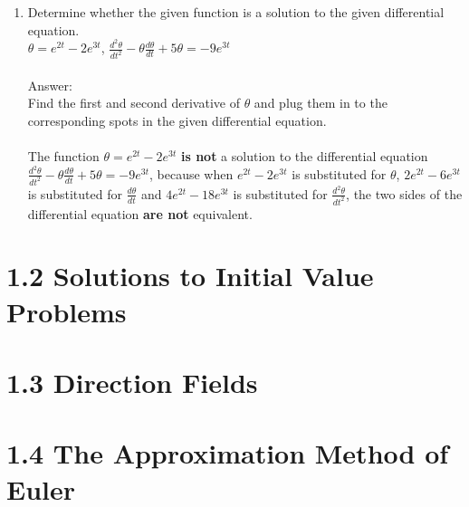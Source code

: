 \documentclass[12pt]{report}
\begin{document}
\begin{enumerate}
				\item Determine whether the given function is a solution to the given differential equation.\\
				$\theta =e^{2t}-2e^{3t}$, $\frac{d^2\theta}{dt^2}-\theta \frac{d\theta}{dt}+5\theta =-9e^{3t}$\\\\
				Answer:\\
				Find the first and second derivative of $\theta$ and plug them in to the corresponding spots in the given differential equation.\\\\
				The function $\theta =e^{2t}-2e^{3t}$ \textbf{is not} a solution to the differential equation $\frac{d^2\theta}{dt^2}-\theta \frac{d\theta}{dt}+5\theta =-9e^{3t}$, because when $e^{2t}-2e^{3t}$ is substituted for $\theta$, $2e^{2t}-6e^{3t}$ is substituted for $\frac{d\theta}{dt}$ and $4e^{2t}-18e^{3t}$ is substituted for $\frac{d^2\theta}{dt^2}$, the two sides of the differential equation \textbf{are not} equivalent.
				
			\end{enumerate}
	\chapter*{1.2 Solutions to Initial Value Problems}
	\chapter*{1.3 Direction Fields}
	\chapter*{1.4 The Approximation Method of Euler}
\end{document}
